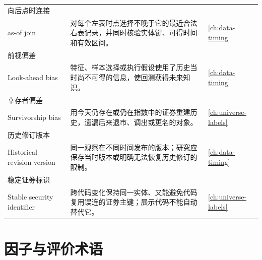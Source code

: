 \begin{longtable}{@{}p{3.2cm}p{9.0cm}p{2.8cm}@{}}
向后点时连接\\as-of join & 对每个左表时点选择不晚于它的最近合法右表记录，并同时核验实体键、可得时间和有效区间。 & \cref{ch:data-timing} \\
前视偏差\\Look-ahead bias & 特征、样本选择或执行假设使用了历史当时尚不可得的信息，使回测获得未来知识。 & \cref{ch:data-timing} \\
幸存者偏差\\Survivorship bias & 用今天仍存在或仍在指数中的证券重建历史，遗漏后来退市、调出或更名的对象。 & \cref{ch:universe-labels} \\
历史修订版本\\Historical revision version & 同一观察在不同时间发布的版本；研究应保存当时版本或明确无法恢复历史修订的限制。 & \cref{ch:data-timing} \\
稳定证券标识\\Stable security identifier & 跨代码变化保持同一实体、又能避免代码复用误连的证券主键；展示代码不能自动替代它。 & \cref{ch:universe-labels} \\
\bottomrule
\end{longtable}
\endgroup

\section{因子与评价术语}

